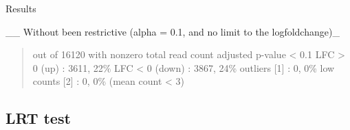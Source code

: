 \documentclass[
]{book}
\begin{document}
Results

\_\_ Without been restrictive (alpha = 0.1, and no limit to the logfoldchange)\_

\begin{quote}
out of 16120 with nonzero total read count
adjusted p-value \textless{} 0.1
LFC \textgreater{} 0 (up) : 3611, 22\%
LFC \textless{} 0 (down) : 3867, 24\%
outliers {[}1{]} : 0, 0\%
low counts {[}2{]} : 0, 0\%
(mean count \textless{} 3)
\end{quote}

\hypertarget{lrt-test}{%
\subsection{LRT test}\label{lrt-test}}

  
\end{document}
